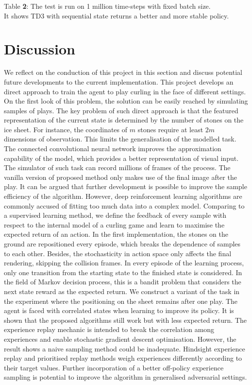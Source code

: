 \documentclass[oneside,11pt,a4paper]{article}
\begin{document}
\begin{center}
    Table \textbf{2}: The test is run on 1 million time-steps with fixed batch size. \\ It shows  TD3 with sequential state returns a better and more stable policy.
\end{center}

\newpage
\section{Discussion}
We reflect on the conduction of this project in this section and discuss potential future developments to the current implementation.
\newline
\newline
\noindent
This project develops an direct approach to train the agent to play curling in the face of different settings. On the first look of this problem, the solution can be easily reached by simulating samples of plays. The key problem of such direct approach is that the featured representation of the current state is determined by the number of stones on the ice sheet. For instance, the coordinates of $m$ stones require at least $2m$ dimensions of observation. This limits the generalisation of the modelled task. The connected convolutional neural network improves the approximation capability of the model, which provides a better representation of visual input. The simulator of such task can record millions of frames of the process. The vanilla version of proposed method only makes use of the final image after the play. It can be argued that further development is possible to improve the sample efficiency of the algorithm. However, deep reinforcement learning algorithms are commonly accused of fitting too much data into a complex model.
\newline
\newline
\noindent
Comparing to a supervised learning method, we define the feedback of every sample with respect to the internal model of a curling game and learn to maximise the expected return of an action. In the first implementation, the stones on the ground are repositioned every episode, which breaks the dependence of samples to each other. Besides, the stochasticity in action space only affects the final rendering, skipping the collision frames. In every episode of the learning process, only one transition from the starting state to the finished state is considered. In the field of Markov decision process, this is a bandit problem that considers the next state reward as the expected return. We construct a variant of the task in the experiment where the positioning on the sheet remains after one play. The agent is faced with correlated states when learning to improve its policy. It is shown that the proposed algorithms still work but with less expected return. The experience replay mechanic is intended to break the correlation among experiences and enable stochastic gradient descent optimisation. However, the result shows a naive sampling method could be inadequate. Hindsight experience replay and prioritised replay methods weigh experiences  differently according to their target values. Further incorporation of a better off-policy experience sampling is potential to improve the algorithm in generalised adversarial settings.
\end{document}
